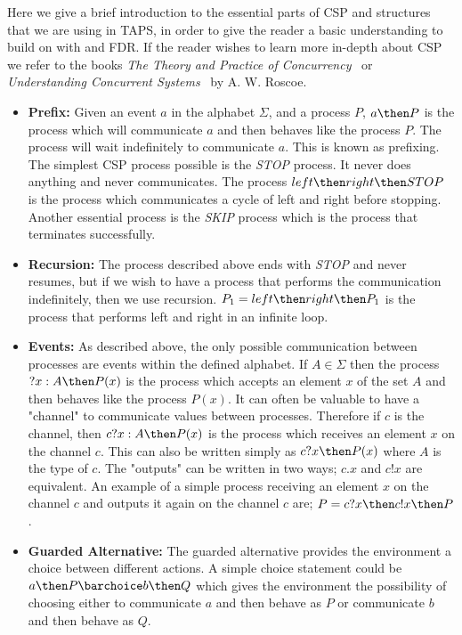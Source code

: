 Here we give a brief introduction to the essential parts of CSP and structures that we are using in TAPS, in order to give the reader a basic understanding to build on with \cspm{} and FDR. If the reader wishes to learn more in-depth about CSP we refer to the books \textit{The Theory and Practice of Concurrency}~\cite{Roscoe1997} or \textit{Understanding Concurrent Systems}~\cite{Roscoe2010} by A. W. Roscoe.
\begin{itemize}
    \item \textbf{Prefix:} Given an event $a$ in the alphabet $\Sigma$, and a process $P$, $a \then P$ is the process which will communicate $a$ and then behaves like the process $P$. The process will wait indefinitely to communicate $a$. This is known as prefixing.
    The simplest CSP process possible is the \textit{STOP} process. It never does anything and never communicates. The process $left \then right \then STOP$ is the process which communicates a cycle of left and right before stopping. Another essential process is the \textit{SKIP} process which is the process that terminates successfully.
    \item \textbf{Recursion:} The process described above ends with \textit{STOP} and never resumes, but if we wish to have a process that performs the communication indefinitely, then we use recursion.
    $P_1 = left \then right \then P_1$ is the process that performs left and right in an infinite loop.
    \item \textbf{Events:} As described above, the only possible communication between processes are events within the defined alphabet. If $A \in \Sigma$ then the process $?x : A \then P(x)$ is the process which accepts an element $x$ of the set $A$ and then behaves like the process $P(x)$.
    It can often be valuable to have a "channel" to communicate values between processes. Therefore if $c$ is the channel, then $c?x : A \then P(x)$ is the process which receives an element $x$ on the channel $c$. This can also be written simply as $c?x \then P(x)$ where $A$ is the type of $c$. The "outputs" can be written in two ways; $c.x$ and $c!x$ are equivalent. An example of a simple process receiving an element $x$ on the channel $c$ and outputs it again on the channel $c$ are; $P = c?x \then c!x \then P$.
    \item \textbf{Guarded Alternative:} The guarded alternative provides the environment a choice between different actions. A simple choice statement could be $a \then P \barchoice b \then Q$ which gives the environment the possibility of choosing either to communicate $a$ and then behave as $P$ or communicate $b$ and then behave as $Q$.

\end{itemize}
